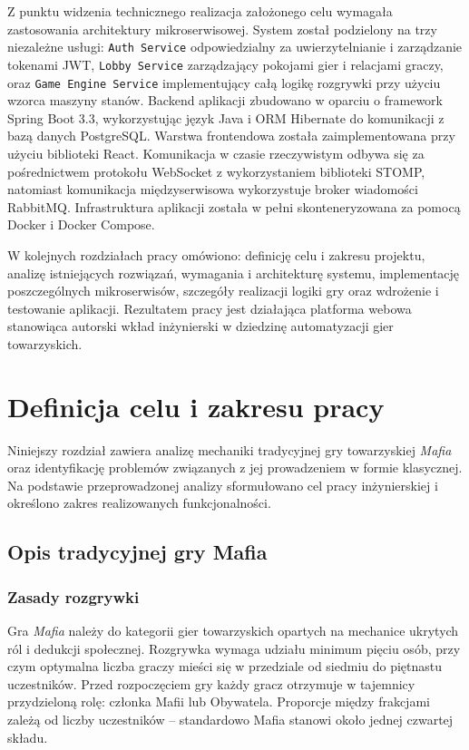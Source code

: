 ﻿\documentclass[a4paper,twoside,11pt]{mwrep}
\theoremstyle{plain} \newtheorem{thm}{Twierdzenie}
\theoremstyle{plain} \newtheorem{lem}{Lemat}
\theoremstyle{definition} \newtheorem{defn}{Definicja}
\theoremstyle{remark} \newtheorem*{rem}{Wniosek}
\begin{document}
Z punktu widzenia technicznego realizacja założonego celu wymagała zastosowania architektury mikroserwisowej. System został podzielony na trzy niezależne usługi: \texttt{Auth Service} odpowiedzialny za uwierzytelnianie i zarządzanie tokenami JWT, \texttt{Lobby Service} zarządzający pokojami gier i relacjami graczy, oraz \texttt{Game Engine Service} implementujący całą logikę rozgrywki przy użyciu wzorca maszyny stanów. Backend aplikacji zbudowano w oparciu o framework Spring Boot 3.3, wykorzystując język Java i ORM Hibernate do komunikacji z bazą danych PostgreSQL. Warstwa frontendowa została zaimplementowana przy użyciu biblioteki React. Komunikacja w czasie rzeczywistym odbywa się za pośrednictwem protokołu WebSocket z wykorzystaniem biblioteki STOMP, natomiast komunikacja międzyserwisowa wykorzystuje broker wiadomości RabbitMQ. Infrastruktura aplikacji została w pełni skonteneryzowana za pomocą Docker i Docker Compose.

W kolejnych rozdziałach pracy omówiono: definicję celu i zakresu projektu, analizę istniejących rozwiązań, wymagania i architekturę systemu, implementację poszczególnych mikroserwisów, szczegóły realizacji logiki gry oraz wdrożenie i testowanie aplikacji. Rezultatem pracy jest działająca platforma webowa stanowiąca autorski wkład inżynierski w dziedzinę automatyzacji gier towarzyskich.

\chapter{Definicja celu i zakresu pracy}
\label{chap:Definicja_celu_i_zakresu_pracy}

Niniejszy rozdział zawiera analizę mechaniki tradycyjnej gry towarzyskiej \textit{Mafia} oraz identyfikację problemów związanych z jej prowadzeniem w formie klasycznej. Na podstawie przeprowadzonej analizy sformułowano cel pracy inżynierskiej i określono zakres realizowanych funkcjonalności.

\section{Opis tradycyjnej gry Mafia}
\label{sec:Opis_tradycyjnej_gry_Mafia}

\subsection{Zasady rozgrywki}

Gra \textit{Mafia} należy do kategorii gier towarzyskich opartych na mechanice ukrytych ról i dedukcji społecznej. Rozgrywka wymaga udziału minimum pięciu osób, przy czym optymalna liczba graczy mieści się w przedziale od siedmiu do piętnastu uczestników. Przed rozpoczęciem gry każdy gracz otrzymuje w tajemnicy przydzieloną rolę: członka Mafii lub Obywatela. Proporcje między frakcjami zależą od liczby uczestników -- standardowo Mafia stanowi około jednej czwartej składu.
\end{document}
